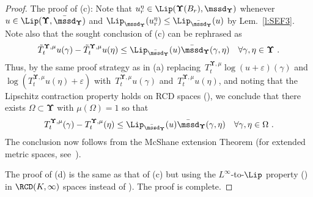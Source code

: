 \documentclass[11pt,letterpaper]{amsart}
\let\epsilon\varepsilon
\newcommand{\comma}{\,\,\mathrm{,}\;\,}
\newcommand{\fstop}{\,\,\mathrm{.}}
\newcommand{\QP}{{\mu}}
\newcommand{\e}{\varepsilon}
\newcommand{\dUpsilon}{{\mathbf \Upsilon}}
\newcommand{\U}{\dUpsilon}
\renewcommand{\1}{\mathbf 1}
\numberwithin{equation}{section}
\theoremstyle{plain}
\theoremstyle{definition}
\theoremstyle{remark}
\begin{document}
\begin{proof}
The proof of (c): Note that $u_r^\eta \in \Lip(\U(B_r), \mssd_\U)$ whenever $u \in \Lip(\U, \bar{\mssd}_\U)$ and $\Lip_{\mssd_\U}(u_r^\eta) \le \Lip_{\bar{\mssd}_\U}(u)$ by Lem.~\ref{l:SEF3}.
Note also that the sought conclusion of (c) can be rephrased as 
$$\tilde{T}^{\U, \QP}_tu(\gamma)-\tilde{T}^{\U, \QP}_tu(\eta) \le \Lip_{\bar{\mssd}_\U}(u) \bar{\mssd}_\U(\gamma, \eta) \quad \forall \gamma, \eta \in \U\fstop$$
Thus, by the same proof strategy as in (a) replacing~$T^{\U, \QP}_{t}\log (u+\e)(\gamma)$ and~$\log (T^{\U, \QP}_{t}u(\eta)+\e)$ with~$T^{\U, \QP}_{t}u(\gamma)$ and~$T^{\U, \QP}_{t}u(\eta)$, and noting that the Lipschitz contraction property holds on RCD spaces (\cite[(iv) in Thm.~6.1]{AmbGigSav14b}), we conclude that there exists $\Omega \subset \U$ with $\QP(\Omega)=1$ so that 
$$T^{\U, \QP}_t(\gamma)-T^{\U, \QP}_t(\eta) \le \Lip_{\bar{\mssd}_\U}(u) \bar{\mssd}_\U(\gamma, \eta) \quad \forall \gamma, \eta \in \Omega\fstop$$
The conclusion now follows from the McShane extension Theorem (for extended metric spaces, see~\cite[Lem.~2.1]{LzDSSuz20}).

The proof of (d) is the same as that of (c) but using the $L^\infty$-to-$\Lip$ property (\cite[Thm.~6.5]{AmbGigSav14b}) in $\RCD(K,\infty)$ spaces instead of \cite[(iv) in Thm.~6.1]{AmbGigSav14b}).
The proof is complete.
\end{proof}
\end{document}
